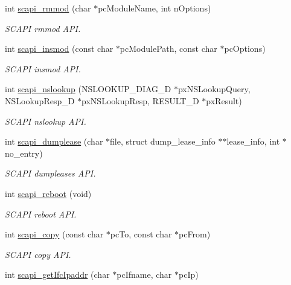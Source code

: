 \begin{DoxyCompactItemize}
int \hyperlink{group__LIBSCAPI_ga85560fcfad682a73dfcf4742d4871b22}{scapi\-\_\-rmmod} (char $\ast$pc\-Module\-Name, int n\-Options)
\begin{DoxyCompactList}\small\item\em S\-C\-A\-P\-I rmmod A\-P\-I. \end{DoxyCompactList}\item 
int \hyperlink{group__LIBSCAPI_gaed31c6ca40eeecd43ea695d593258db0}{scapi\-\_\-insmod} (const char $\ast$pc\-Module\-Path, const char $\ast$pc\-Options)
\begin{DoxyCompactList}\small\item\em S\-C\-A\-P\-I insmod A\-P\-I. \end{DoxyCompactList}\item 
int \hyperlink{group__LIBSCAPI_ga50b96871349c8314bccbd750f9d188e0}{scapi\-\_\-nslookup} (N\-S\-L\-O\-O\-K\-U\-P\-\_\-\-D\-I\-A\-G\-\_\-\-D $\ast$px\-N\-S\-Lookup\-Query, N\-S\-Lookup\-Resp\-\_\-\-D $\ast$px\-N\-S\-Lookup\-Resp, R\-E\-S\-U\-L\-T\-\_\-\-D $\ast$px\-Result)
\begin{DoxyCompactList}\small\item\em S\-C\-A\-P\-I nslookup A\-P\-I. \end{DoxyCompactList}\item 
int \hyperlink{group__LIBSCAPI_gab079cbd4f17a96e543e97f5d7af50513}{scapi\-\_\-dumplease} (char $\ast$file, struct dump\-\_\-lease\-\_\-info $\ast$$\ast$lease\-\_\-info, int $\ast$no\-\_\-entry)
\begin{DoxyCompactList}\small\item\em S\-C\-A\-P\-I dumpleases A\-P\-I. \end{DoxyCompactList}\item 
int \hyperlink{group__LIBSCAPI_ga98953633f9849c3fdf33b2bd3cf31ac3}{scapi\-\_\-reboot} (void)
\begin{DoxyCompactList}\small\item\em S\-C\-A\-P\-I reboot A\-P\-I. \end{DoxyCompactList}\item 
int \hyperlink{group__LIBSCAPI_ga08d58b39a0a3ab6958cf8dcee10671db}{scapi\-\_\-copy} (const char $\ast$pc\-To, const char $\ast$pc\-From)
\begin{DoxyCompactList}\small\item\em S\-C\-A\-P\-I copy A\-P\-I. \end{DoxyCompactList}\item 
int \hyperlink{group__LIBSCAPI_ga5557b8c55bcfe7c834799ca0520b2646}{scapi\-\_\-get\-Ifc\-Ipaddr} (char $\ast$pc\-Ifname, char $\ast$pc\-Ip)
$$
\end{DoxyCompactItemize}
